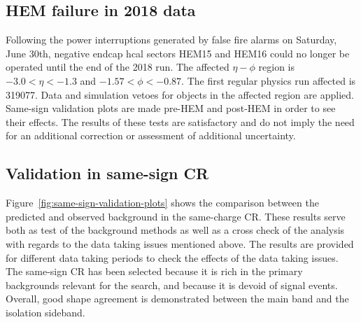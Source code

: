 \subsection{HEM failure in 2018 data}

Following the power interruptions generated by false fire alarms on Saturday, June 30th, negative endcap \gls{hcal} sectors HEM15 and HEM16 could no longer be operated until the end of the 2018 run. The affected $\eta-\phi$ region is $-3.0<\eta<-1.3$ and $-1.57<\phi<-0.87$. The first regular physics run affected is 319077. Data and simulation vetoes for objects in the affected region are applied. Same-sign validation plots are made pre-HEM and post-HEM in order to see their effects. The results of these tests are satisfactory and do not imply the need for an additional correction or assessment of additional uncertainty.

\subsection{Validation in same-sign CR}
\label{sec:same-sign-validation-plots}

Figure~\ref{fig:same-sign-validation-plots} shows the comparison between the predicted and observed background in the same-charge CR. These results serve both as test of the background methods as well as a cross check of the analysis with regards to the data taking issues mentioned above. The results are provided for different data taking periods to check the effects of the data taking issues. The same-sign CR has been selected because it is rich in the primary backgrounds relevant for the search, and because it is devoid of signal events. Overall, good shape agreement is demonstrated between the main band and the isolation sideband.

